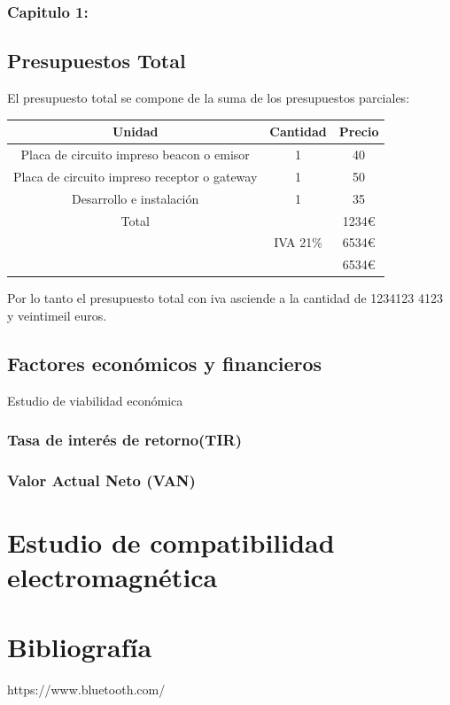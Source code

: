 \documentclass[a4paper ,12pt, onecolumn]{article}
\begin{document}
            \subsubsection{Capitulo 1: }
    \subsection{Presupuestos Total}
        El presupuesto total se compone de la suma de los presupuestos parciales:
        \begin{center}
            \begin{tabular}{||c | c |c ||} 
            \hline
            Unidad & Cantidad & Precio  \\ [0.5ex] 
            \hline\hline
            Placa de circuito impreso beacon o emisor & 1 & 40 \\ 
            Placa de circuito impreso receptor o gateway & 1 & 50 \\ 
            Desarrollo e instalación & 1 & 35 \\ 
            \hline
            \hline
            Total &  & 1234€ \\ 
             & IVA 21\%& 6534€ \\ 
             & & 6534€ \\ 
            \hline
            \end{tabular}
        \end{center}
        Por lo tanto el presupuesto total con iva asciende a la cantidad de 1234123 4123 y veintimeil euros.
    \subsection{Factores económicos y financieros}
    Estudio de viabilidad económica
        \subsubsection{Tasa de interés de retorno(TIR)}
        \subsubsection{Valor Actual Neto (VAN)}
\section{Estudio de compatibilidad electromagnética}

\section{Bibliografía}
https://www.bluetooth.com/
\end{document}
